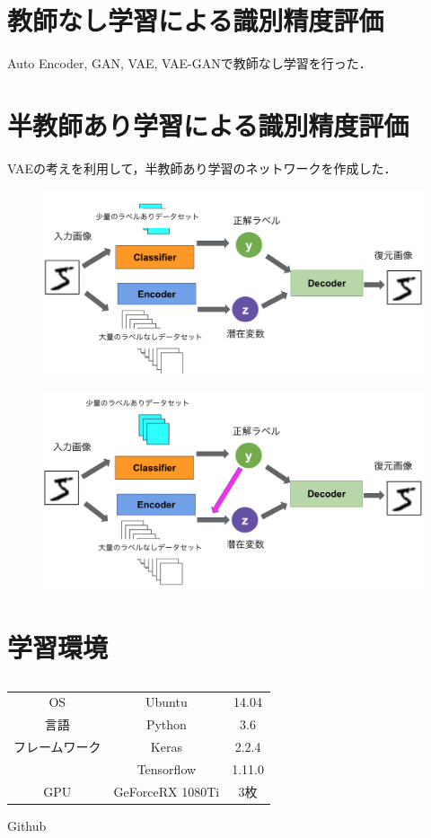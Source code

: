 \section{教師なし学習による識別精度評価}
Auto Encoder, GAN, VAE, VAE-GANで教師なし学習を行った．

\section{半教師あり学習による識別精度評価}
VAEの考えを利用して，半教師あり学習のネットワークを作成した．
\begin{figure}
	\centering
	\includegraphics[width=0.7\linewidth]{fig/chapter3/networks/patern_A}
	\caption{}
	\label{fig:paterna}
\end{figure}

\begin{figure}
	\centering
	\includegraphics[width=0.7\linewidth]{fig/chapter3/networks/patern_B}
	\caption{}
	\label{fig:paterna}
\end{figure}

\section{学習環境}
\begin{table}[H]
	\centering
	\caption{}
	\label{tab:}
	\begin{tabular}{ccc}\toprule
		OS & Ubuntu & 14.04 \\ 
		言語 & Python & 3.6 \\ 
		フレームワーク & Keras & 2.2.4 \\ 
		& Tensorflow & 1.11.0 \\ 
		GPU & GeForceRX 1080Ti & 3枚 \\  \bottomrule
	\end{tabular}
\end{table}
Github

